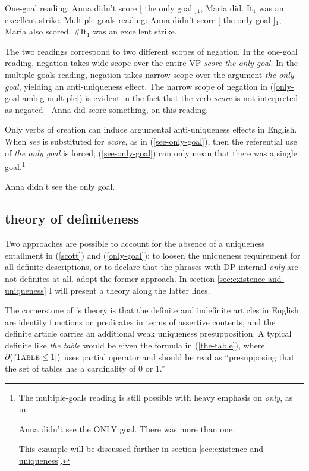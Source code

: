 \begin{exe}
	\ex \label{only-goal-ambig-one} One-goal reading: Anna didn't score [ the only goal ]$_1$, Maria did. It$_1$ was an excellent strike.
	\ex \label{only-goal-ambig-multiple} Multiple-goals reading: Anna didn't score [ the only goal ]$_1$, Maria also scored. \#It$_1$ was an excellent strike.
\end{exe}

The two readings correspond to two different scopes of negation. In the one-goal reading, negation takes wide scope over the entire VP \textit{score the only goal}. In the multiple-goals reading, negation takes narrow scope over the argument \textit{the only goal}, yielding an anti-uniqueness effect. The narrow scope of negation in (\ref{only-goal-ambig-multiple}) is evident in the fact that the verb \textit{score} is not interpreted as negated---Anna did score something, on this reading.

Only verbs of creation can induce argumental anti-uniqueness effects in English. When \textit{see} is substituted for \textit{score}, as in (\ref{see-only-goal}), then the referential use of \textit{the only goal} is forced; (\ref{see-only-goal}) can only mean that there was a single goal.\footnote{The multiple-goals reading is still possible with heavy emphasis on \textit{only}, as in: \begin{exe} \ex Anna didn't see the ONLY goal. There was more than one. \end{exe} This example will be discussed further in section \ref{sec:existence-and-uniqueness}.}

\begin{exe}
	\ex \label{see-only-goal} Anna didn't see the only goal.
\end{exe}

\subsection{ theory of definiteness}
Two approaches are possible to account for the absence of a uniqueness entailment in (\ref{scott}) and (\ref{only-goal}): to loosen the uniqueness requirement for all definite descriptions, or to declare that the phrases with DP-internal \textit{only} are not definites at all. \citeauthor{cb2015} adopt the former approach. In section \ref{sec:existence-and-uniqueness} I will present a theory along the latter lines.

The cornerstone of \citeauthor{cb2015}'s theory is that the definite and indefinite articles in English are identity functions on predicates in terms of assertive contents, and the definite article carries an additional weak uniqueness presupposition. A typical definite like \textit{the table} would be given the formula in (\ref{the-table}), where $\partial(|\textsc{Table} \le 1|)$ uses  partial operator and should be read as ``presupposing that the set of tables has a cardinality of 0 or 1.''


